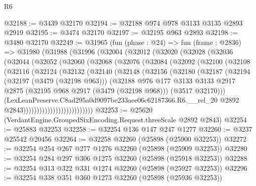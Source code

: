 \begin{lexlean}{R6}
\begin{coremodule}
@32188 := @3439 @32170
@32194 := @32188 @974 @978 @3133 @3135 @2893 @2919
@32195 := @3474 @32170
@32197 := @32195 @963 @2893
@32198 := @3480 @32170
@32249 := @31965
    (fun (phase : @24) =>
    fun (frame : @2836) =>
    @31980
      (@31988
        (@31996
          (@32004
            (@32012
              (@32020
                (@32028
                  (@32036
                    (@32044
                      (@32052
                        (@32060
                          (@32068
                            (@32076
                              (@32084
                                (@32092
                                  (@32100
                                    (@32108
                                      (@32116
                                        (@32124
                                          (@32132
                                            (@32140
                                              (@32148
                                                (@32156
                                                  (@32180
                                                    (@32187
                                                      (@32194
                                                        (@32197 (@3479 (@32198 @963)))
                                                        (@32188
                                                          @976
                                                          @177
                                                          @3133
                                                          @3133
                                                          @2917
                                                          @2875
                                                          (@32195 @968 @2917 (@3479 (@32198 @968)))
                                                          (@3517 @32170)))
                                                      (LexLeanPreserve.C8ad295a0d9097be233aee06c62187366.R6.__rel_20
                                                        @2892
                                                        @2843))))))))))))))))))))))))))
@32253 := @25620 (VerdantEngine.GroupedSixEncoding.Request.threeScale @2892 @2843)
@32254 := @25883 @32253
@32258 := @32254 @136 @147 @247 @1277
@32260 := @3237 @25542 @20456
@32264 := @32258 @32260 (@25898 (@25900 @32253))
@32272 := @32254 @254 @267 @277 @1276 @32260 (@25898 (@25909 @32253))
@32280 := @32254 @284 @297 @306 @1275 @32260 (@25898 (@25918 @32253))
@32288 := @32254 @313 @322 @331 @1274 @32260 (@25898 (@25927 @32253))
@32296 := @32254 @338 @351 @360 @1273 @32260 (@25898 (@25936 @32253))

\end{coremodule}
\end{lexlean}

